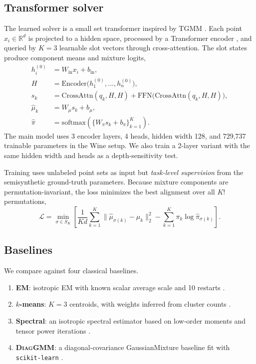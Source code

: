 \documentclass{article}
\newcommand{\tgmm}{\textsc{TGMM}}
\newcommand{\diaggmm}{\textsc{DiagGMM}}
\begin{document}
\subsection{Transformer solver}
The learned solver is a small set transformer \citep{lee2019settransformer} inspired by \tgmm{} \citep{chen2026tgmm}. Each point $x_i \in \mathbb{R}^d$ is projected to a hidden space, processed by a Transformer encoder \citep{vaswani2017attention}, and queried by $K=3$ learnable slot vectors through cross-attention. The slot states produce component means and mixture logits,
\begin{align}
h_i^{(0)} &= W_{\mathrm{in}} x_i + b_{\mathrm{in}}, \\
H &= \mathrm{Encoder}\bigl(h_1^{(0)}, \dots, h_n^{(0)}\bigr), \\
s_k &= \mathrm{CrossAttn}(q_k,H,H) + \mathrm{FFN}\bigl(\mathrm{CrossAttn}(q_k,H,H)\bigr), \\
\hat{\mu}_k &= W_\mu s_k + b_\mu, \\
\hat{\pi} &= \mathrm{softmax}\!\left(\{W_\pi s_k + b_\pi\}_{k=1}^K\right).
\end{align}
The main model uses 3 encoder layers, 4 heads, hidden width 128, and 729{,}737 trainable parameters in the Wine setup. We also train a 2-layer variant with the same hidden width and heads as a depth-sensitivity test.

Training uses unlabeled point sets as input but \emph{task-level supervision} from the semisynthetic ground-truth parameters. Because mixture components are permutation-invariant, the loss minimizes the best alignment over all $K!$ permutations,
\begin{equation}
\mathcal{L} = \min_{\sigma \in S_K}
\left[
\frac{1}{Kd} \sum_{k=1}^K \lVert \hat{\mu}_{\sigma(k)} - \mu_k \rVert_2^2
- \sum_{k=1}^K \pi_k \log \hat{\pi}_{\sigma(k)}
\right].
\end{equation}

\subsection{Baselines}
We compare against four classical baselines.
\begin{enumerate}[leftmargin=1.4em]
    \item \textbf{EM}: isotropic EM with known scalar average scale and 10 restarts \citep{dempster1977em}.
    \item \textbf{$k$-means}: $K=3$ centroids, with weights inferred from cluster counts \citep{macqueen1967kmeans}.
    \item \textbf{Spectral}: an isotropic spectral estimator based on low-order moments and tensor power iterations \citep{anandkumar2014tensor}.
    \item \textbf{\diaggmm}: a diagonal-covariance GaussianMixture baseline fit with \texttt{scikit-learn} \citep{pedregosa2011scikit}.
\end{enumerate}
\end{document}
